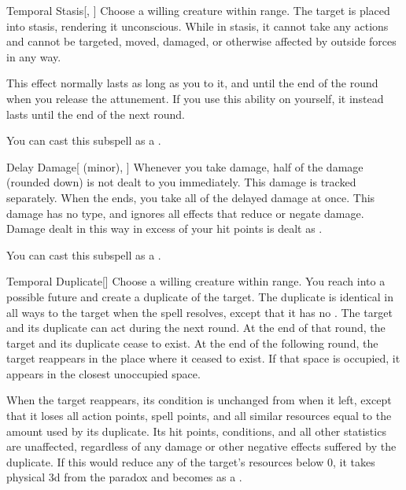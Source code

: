 \begin{ability}[\nth{3}]{Temporal Stasis}[, ]
Choose a willing creature within \rngclose range.
The target is placed into stasis, rendering it unconscious.
While in stasis, it cannot take any actions and cannot be targeted, moved, damaged, or otherwise affected by outside forces in any way.

This effect normally lasts as long as you  to it, and until the end of the round when you release the attunement.
If you use this ability on yourself, it instead lasts until the end of the next round.

You can cast this subspell as a .
\end{ability}
\vspace{0.25em}


\begin{ability}[\nth{4}]{Delay Damage}[ (minor), ]
Whenever you take damage, half of the damage (rounded down) is not dealt to you immediately.
This damage is tracked separately.
When the ends, you take all of the delayed damage at once.
This damage has no type, and ignores all effects that reduce or negate damage.
Damage dealt in this way in excess of your hit points is dealt as .

You can cast this subspell as a .
\end{ability}
\vspace{0.25em}


\begin{ability}[\nth{5}]{Temporal Duplicate}[]
Choose a willing creature within \rngmed range.
You reach into a possible future and create a duplicate of the target.
The duplicate is identical in all ways to the target when the spell resolves, except that it has no .
The target and its duplicate can act during the next round.
At the end of that round, the target and its duplicate cease to exist.
At the end of the following round, the target reappears in the place where it ceased to exist.
If that space is occupied, it appears in the closest unoccupied space.

When the target reappears, its condition is unchanged from when it left, except that it loses all action points, spell points, and all similar resources equal to the amount used by its duplicate.
Its hit points, conditions, and all other statistics are unaffected, regardless of any damage or other negative effects suffered by the duplicate.
If this would reduce any of the target's resources below 0, it takes physical  \plus3d from the paradox and becomes  as a .
\end{ability}
\vspace{0.25em}


